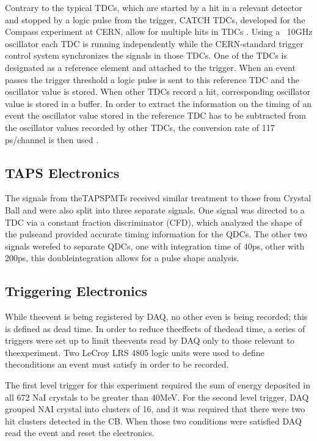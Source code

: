 \indent Contrary to the typical TDCs, which are started by a hit in a relevant detector and stopped by a logic pulse from the trigger, CATCH TDCs, developed for the Compass experiment at CERN, allow for multiple hits in TDCs \cite{gbruan}. Using a ~10GHz oscillator each TDC is running independently while the CERN-standard trigger control system synchronizes the signals in those TDCs. One of the TDCs is designated as a reference element and attached to the trigger. When an event passes the trigger threshold a logic pulse is sent to this reference TDC and the oscillator value is stored. When other TDCs record a hit, corresponding oscillator value is stored in a buffer. In order to extract the information on the timing of an event the oscillator value stored in the reference TDC has to be subtracted from the oscillator values recorded by other TDCs, the conversion rate of 117 ps/channel is then used \cite{lschmitt}.

\subsection{TAPS Electronics}

\indent The signals from theTAPSPMTs received similar treatment to those from Crystal Ball and were also split into three separate signals. One signal was directed to a TDC via a constant fraction discriminator (CFD), which analyzed the shape of the pulseand provided accurate timing information for the QDCs. The other two signals werefed to separate QDCs, one with integration time of 40ps, other with 200ps, this doubleintegration allows for a pulse shape analysis.

\subsection{Triggering Electronics}

\indent While theevent is being registered by DAQ, no other even is being recorded; this is defined as dead time. In order to reduce theeffects of thedead time, a series of triggers were set up to limit theevents read by DAQ only to those relevant to theexperiment. Two LeCroy LRS 4805 logic units were used to define theconditions an event must satisfy in order to be recorded.

\indent The first level trigger for this experiment required the sum of energy deposited in all 672 NaI crystals to be greater than 40MeV. For the second level trigger, DAQ grouped NAI crystal into clusters of 16, and it was required that there were two hit clusters detected in the CB. When those two conditions were satisfied DAQ read the event and reset the electronics.


